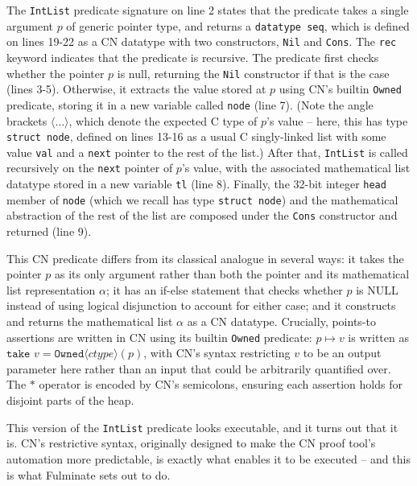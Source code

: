 The \texttt{IntList} predicate signature on line 2 states that the predicate takes a single argument $p$ of generic pointer type, and returns a \texttt{datatype seq}, which is defined on lines 19-22 as a CN datatype with two constructors, \texttt{Nil} and \texttt{Cons}. The \texttt{rec} keyword indicates that the predicate is recursive. The predicate first checks whether the pointer $p$ is null, returning the \texttt{Nil} constructor if that is the case (lines 3-5). Otherwise, it extracts the value stored at $p$ using CN's builtin \texttt{Owned} predicate, storing it in a new variable called \texttt{node} (line 7). (Note the angle brackets $\langle\ldots\rangle$, which denote the expected C type of $p$'s value -- here, this has type \texttt{struct node}, defined on lines 13-16 as a usual C singly-linked list with some value \texttt{val} and a \texttt{next} pointer to the rest of the list.) After that, \texttt{IntList} is called recursively on the \texttt{next} pointer of $p$'s value, with the associated mathematical list datatype stored in a new variable \texttt{tl} (line 8). Finally, the 32-bit integer \texttt{head} member of \texttt{node} (which we recall has type \texttt{struct node}) and the mathematical abstraction of the rest of the list are composed under the \texttt{Cons} constructor and returned (line 9).  


This CN predicate differs from its classical analogue in several ways: it takes the pointer $p$ as its only argument rather than both the pointer and its mathematical list representation $\alpha$; it has an if-else statement that checks whether $p$ is NULL instead of using logical disjunction to account for either case; and it constructs and returns the mathematical list $\alpha$ as a CN datatype. Crucially, points-to assertions are written in CN using its builtin \texttt{Owned} predicate: $p \mapsto v$ is written as $\texttt{take}\,\,v = \texttt{Owned}\langle\textit{ctype}\rangle(p)$, with CN's syntax restricting $v$ to be an output parameter here rather than an input that could be arbitrarily quantified over. The $\ast$ operator is encoded by CN's semicolons, ensuring each assertion holds for disjoint parts of the heap.

This version of the \texttt{IntList} predicate looks executable, and it turns out that it is. CN's restrictive syntax, originally designed to make the CN proof tool's automation more predictable, is exactly what enables it to be executed -- and this is what Fulminate sets out to do.

